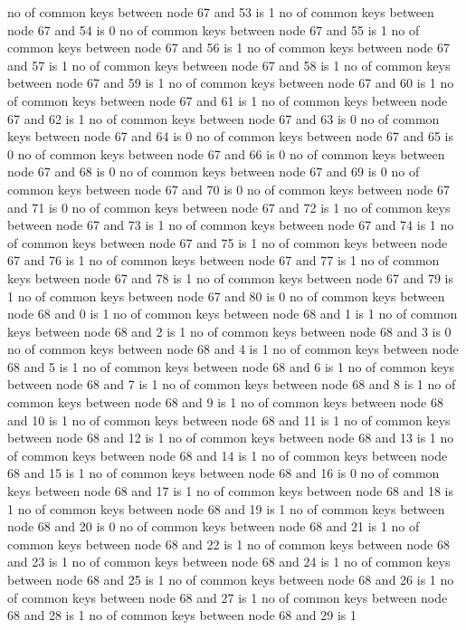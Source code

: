 no of common keys between node 67 and 53 is 1
no of common keys between node 67 and 54 is 0
no of common keys between node 67 and 55 is 1
no of common keys between node 67 and 56 is 1
no of common keys between node 67 and 57 is 1
no of common keys between node 67 and 58 is 1
no of common keys between node 67 and 59 is 1
no of common keys between node 67 and 60 is 1
no of common keys between node 67 and 61 is 1
no of common keys between node 67 and 62 is 1
no of common keys between node 67 and 63 is 0
no of common keys between node 67 and 64 is 0
no of common keys between node 67 and 65 is 0
no of common keys between node 67 and 66 is 0
no of common keys between node 67 and 68 is 0
no of common keys between node 67 and 69 is 0
no of common keys between node 67 and 70 is 0
no of common keys between node 67 and 71 is 0
no of common keys between node 67 and 72 is 1
no of common keys between node 67 and 73 is 1
no of common keys between node 67 and 74 is 1
no of common keys between node 67 and 75 is 1
no of common keys between node 67 and 76 is 1
no of common keys between node 67 and 77 is 1
no of common keys between node 67 and 78 is 1
no of common keys between node 67 and 79 is 1
no of common keys between node 67 and 80 is 0
no of common keys between node 68 and 0 is 1
no of common keys between node 68 and 1 is 1
no of common keys between node 68 and 2 is 1
no of common keys between node 68 and 3 is 0
no of common keys between node 68 and 4 is 1
no of common keys between node 68 and 5 is 1
no of common keys between node 68 and 6 is 1
no of common keys between node 68 and 7 is 1
no of common keys between node 68 and 8 is 1
no of common keys between node 68 and 9 is 1
no of common keys between node 68 and 10 is 1
no of common keys between node 68 and 11 is 1
no of common keys between node 68 and 12 is 1
no of common keys between node 68 and 13 is 1
no of common keys between node 68 and 14 is 1
no of common keys between node 68 and 15 is 1
no of common keys between node 68 and 16 is 0
no of common keys between node 68 and 17 is 1
no of common keys between node 68 and 18 is 1
no of common keys between node 68 and 19 is 1
no of common keys between node 68 and 20 is 0
no of common keys between node 68 and 21 is 1
no of common keys between node 68 and 22 is 1
no of common keys between node 68 and 23 is 1
no of common keys between node 68 and 24 is 1
no of common keys between node 68 and 25 is 1
no of common keys between node 68 and 26 is 1
no of common keys between node 68 and 27 is 1
no of common keys between node 68 and 28 is 1
no of common keys between node 68 and 29 is 1
